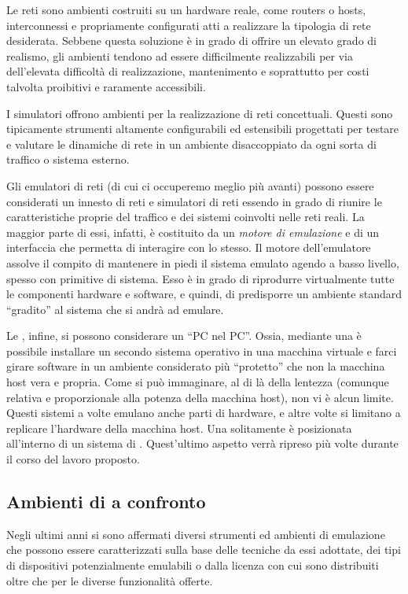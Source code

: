 Le reti \testbed{} sono ambienti costruiti su un hardware reale, come routers o hosts, interconnessi e propriamente configurati atti a realizzare la tipologia di rete desiderata. Sebbene questa soluzione è in grado di offrire un elevato grado di realismo, gli ambienti \testbed{} tendono ad essere difficilmente realizzabili per via dell'elevata difficoltà di realizzazione, mantenimento e soprattutto per costi talvolta proibitivi e raramente accessibili.

I simulatori offrono ambienti per la realizzazione di reti concettuali. Questi sono tipicamente strumenti altamente configurabili ed estensibili progettati per testare e valutare le dinamiche di rete in un ambiente disaccoppiato da ogni sorta di traffico o sistema esterno. 

Gli emulatori di reti (di cui ci occuperemo meglio più avanti) possono essere considerati un innesto di reti \testbed{} e simulatori di reti essendo in grado di riunire le caratteristiche proprie del traffico e dei sistemi coinvolti nelle reti reali. La maggior parte di essi, infatti, è costituito da un \emph{motore di emulazione} e di un interfaccia che permetta di interagire con lo stesso. Il motore dell'emulatore assolve il compito di mantenere in piedi il sistema emulato agendo a basso livello, spesso con primitive di sistema. Esso è in grado di riprodurre virtualmente tutte le componenti hardware e software, e quindi, di predisporre un ambiente standard ``gradito'' al sistema che si andrà ad emulare.

Le \virtualmachine{}, infine, si possono considerare un ``PC nel PC''. Ossia, mediante una \virtualmachine{} è possibile installare un secondo sistema operativo in una macchina virtuale e farci girare software in un ambiente considerato più ``protetto'' che non la macchina host vera e propria. Come si può immaginare, al di là della lentezza (comunque relativa e proporzionale alla potenza della macchina host), non vi è alcun limite. Questi sistemi a volte emulano anche parti di hardware, e altre volte si limitano a replicare l'hardware della macchina host. Una \virtualmachine{} solitamente è posizionata all'interno di un sistema di \emulazione{}. Quest'ultimo aspetto verrà ripreso più volte durante il corso del lavoro proposto.


\subsection{Ambienti di \emulazione{} a confronto}
Negli ultimi anni si sono affermati diversi strumenti ed ambienti di emulazione che possono essere caratterizzati sulla base delle tecniche da essi adottate, dei tipi di dispositivi potenzialmente emulabili o dalla licenza con cui sono distribuiti oltre che per le diverse funzionalità offerte.

